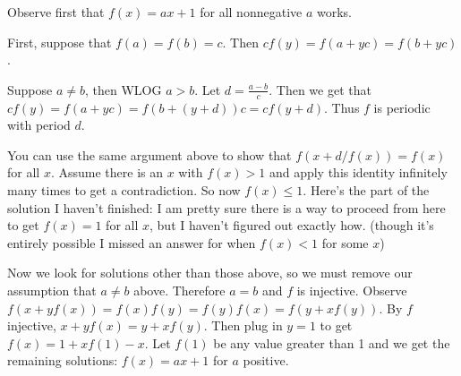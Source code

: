 \begin{mysolution}
Observe first that $ f(x) = ax+1$ for all nonnegative $ a$ works.

First, suppose that $ f(a) = f(b) = c$. Then $ cf(y) = f(a+yc) = f(b+yc)$.

Suppose $ a \neq b$, then WLOG $ a > b$. Let $ d = \frac{a-b}{c}$. Then we get that $ cf(y) = f(a+yc) = f(b+(y+d))c = cf(y+d)$. Thus $ f$ is periodic with period $ d$.

You can use the same argument above to show that $ f(x+d/f(x)) = f(x)$ for all $ x$. Assume there is an $ x$ with $ f(x) > 1$ and apply this identity infinitely many times to get a contradiction. So now $ f(x) \leq 1$. Here's the part of the solution I haven't finished: I am pretty sure there is a way to proceed from here to get $ f(x) = 1$ for all $ x$, but I haven't figured out exactly how. (though it's entirely possible I missed an answer for when $ f(x) < 1$ for some $ x$)

Now we look for solutions other than those above, so we must remove our assumption that $ a \neq b$ above. Therefore $ a = b$ and $ f$ is injective. Observe $ f(x+yf(x)) = f(x)f(y) = f(y)f(x) = f(y+xf(y))$. By $ f$ injective, $ x+yf(x) = y+xf(y)$. Then plug in $ y = 1$ to get $ f(x) = 1+xf(1)-x$. Let $ f(1)$ be any value greater than 1 and we get the remaining solutions: $ f(x) = ax+1$ for $ a$ positive.

\end{mysolution}



